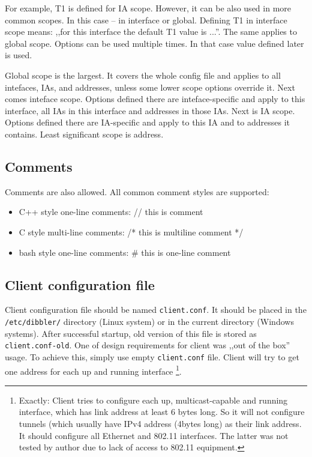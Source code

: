 For example, T1 is defined for
IA scope. However, it can be also used in more common scopes. In this
case -- in interface or global. Defining T1 in interface scope means:
,,for this interface the default T1 value is ...''. The same applies
to global scope. Options can be used multiple times. In that case
value defined later is used.

Global scope is the largest. It covers the whole config file and
applies to all intefaces, IAs, and addresses, unless some lower scope
options override it. Next comes inteface scope. Options defined there
are inteface-specific and apply to this interface, all IAs in this
interface and addresses in those IAs. Next is IA scope. Options
defined there are IA-specific and apply to this IA and to addresses it
contains. Least significant scope is address. 

\subsection{Comments}

Comments are also allowed. All common comment styles are supported:
\begin{itemize}
\item C++ style one-line comments: // this is comment
\item C style multi-line comments: /* this is multiline comment */
\item bash style one-line comments: \# this is one-line comment
\end{itemize}

\subsection{Client configuration file}
\label{client-cfg-file}
Client configuration file should be named \verb+client.conf+. It should be
placed in the \verb+/etc/dibbler/+ directory (Linux system) or in the
current directory (Windows systems). After successful startup, old
version of this file is stored as \verb+client.conf-old+. One of
design requirements for client was ,,out of the box'' usage. To
achieve this, simply use empty 
\verb+client.conf+ file. Client will try to get one address for each up and
running interface \footnote{Exactly: Client tries to configure each
  up, multicast-capable and running interface, which has link address
  at least 6 bytes long. So it will not configure tunnels (which
  usually have IPv4 address (4bytes long) as their link address. It
  should configure all Ethernet and 802.11 interfaces. The latter was
  not tested by author due to lack of access to 802.11 equipment.}.

